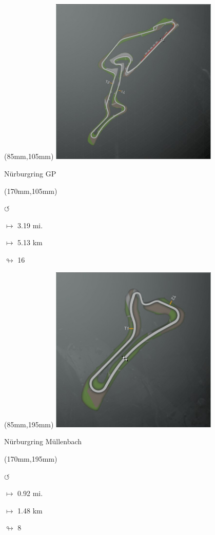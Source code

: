 \begin{textblock*}{80mm}(85mm,105mm)%
\includegraphics[width=80mm]{TR/2015-05-20_00041.png}
\centerline{Nürburgring GP}
\end{textblock*}
\begin{textblock*}{30mm}(170mm,105mm)%
\par \Huge$\circlearrowleft$
\Large
\par$\mapsto$ 3.19 mi.
\par$\mapsto$ 5.13 km
\par$\looparrowright$ 16
\end{textblock*}
\begin{textblock*}{80mm}(85mm,195mm)%
\includegraphics[width=80mm]{TR/2015-05-20_00042.png}
\centerline{Nürburgring Müllenbach}
\end{textblock*}
\begin{textblock*}{30mm}(170mm,195mm)%
\par \Huge$\circlearrowleft$
\Large
\par$\mapsto$ 0.92 mi.
\par$\mapsto$ 1.48 km
\par$\looparrowright$ 8
\end{textblock*}
\null\newpage

